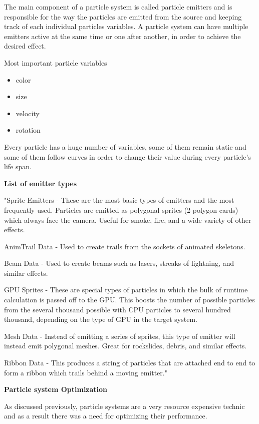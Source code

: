\documentclass[a4paper,one side,12pt]{book}
\begin{document}
The main component of a particle system is called particle emitters and
is responsible for the way the particles are emitted from the source and
keeping track of each individual particles variables. A particle system
can have multiple emitters active at the same time or one after another,
in order to achieve the desired effect.

Most important particle variables

\begin{itemize}
\item
  color
\item
  size
\item
  velocity
\item
  rotation
\end{itemize}

Every particle has a huge number of variables, some of them remain
static and some of them follow curves in order to change their value
during every particle's life span.

\textbf{List of emitter types}

"Sprite Emitters - These are the most basic types of emitters and the
most frequently used. Particles are emitted as polygonal sprites
(2-polygon cards) which always face the camera. Useful for smoke, fire,
and a wide variety of other effects.

AnimTrail Data - Used to create trails from the sockets of animated
skeletons.

Beam Data - Used to create beams such as lasers, streaks of lightning,
and similar effects.

GPU Sprites - These are special types of particles in which the bulk of
runtime calculation is passed off to the GPU. This boosts the number of
possible particles from the several thousand possible with CPU particles
to several hundred thousand, depending on the type of GPU in the target
system.

Mesh Data - Instead of emitting a series of sprites, this type of
emitter will instead emit polygonal meshes. Great for rockslides,
debris, and similar effects.

Ribbon Data - This produces a string of particles that are attached end
to end to form a ribbon which trails behind a moving emitter."\cite{particles_ue}

\textbf{Particle system Optimization}

As discussed previously, particle systems are a very resource expensive
technic and as a result there was a need for optimizing their
performance.
\end{document}
